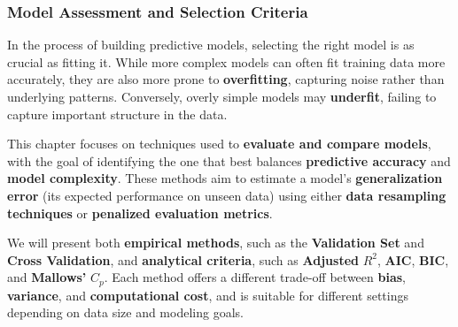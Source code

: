 \subsubsection{Model Assessment and Selection Criteria}

In the process of building predictive models, selecting the right model is as crucial as fitting it. While more complex models can often fit training data more accurately, they are also more prone to \textbf{overfitting}, capturing noise rather than underlying patterns. Conversely, overly simple models may \textbf{underfit}, failing to capture important structure in the data.

\highspace
This chapter focuses on techniques used to \textbf{evaluate and compare models}, with the goal of identifying the one that best balances \textbf{predictive accuracy} and \textbf{model complexity}. These methods aim to estimate a model's \textbf{generalization error} (its expected performance on unseen data) using either \textbf{data resampling techniques} or \textbf{penalized evaluation metrics}.

\highspace
We will present both \textbf{empirical methods}, such as the \textbf{Validation Set} and \textbf{Cross Validation}, and \textbf{analytical criteria}, such as \textbf{Adjusted} $R^2$, \textbf{AIC}, \textbf{BIC}, and \textbf{Mallows'} $C_p$. Each method offers a different trade-off between \textbf{bias}, \textbf{variance}, and \textbf{computational cost}, and is suitable for different settings depending on data size and modeling goals.

